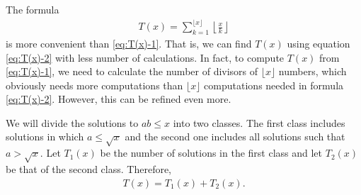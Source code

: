 \documentclass[12pt]{subfile}
\begin{document}
The formula
	\begin{align}
		T(x) = \sum_{k=1}^{\lfloor x \rfloor} \left\lfloor \frac{x}{k} \right\rfloor \label{eq:T(x)-2}
	\end{align}
is more convenient than \ref{eq:T(x)-1}. That is, we can find $T(x)$ using equation \ref{eq:T(x)-2} with less number of calculations. In fact, to compute $T(x)$ from \ref{eq:T(x)-1}, we need to calculate the number of divisors of $\lfloor x \rfloor$ numbers, which obviously needs more computations than $\lfloor x \rfloor$  computations needed in formula \ref{eq:T(x)-2}. However, this can be refined even more.

We will divide the solutions to $ab \leq x$ into two classes. The first class includes solutions in which $a \leq \sqrt x$ and the second one includes all solutions such that $a > \sqrt x$. Let $T_1(x)$ be the number of solutions in the first class and let $T_2(x)$ be that of the second class. Therefore,
	\begin{align*}
		T(x) = T_1(x) + T_2(x).
	\end{align*}
\end{document}
